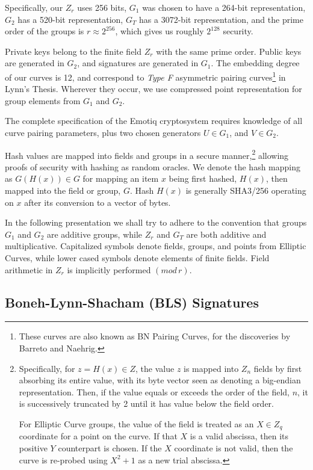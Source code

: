 \documentclass{yellowpaper}
\begin{document}
Specifically, our $Z_r$ uses 256 bits, $G_1$ was chosen to have a 264-bit representation, $G_2$ has a 520-bit representation, $G_T$ has a 3072-bit representation, and the prime order of the groups is $r \approx  2^{256}$, which gives us roughly $2^{128}$ security.

Private keys belong to the finite field $Z_r$ with the same prime order. Public keys are generated in $G_2$, and signatures are generated in $G_1$. The embedding degree of our curves is 12, and correspond to {\emph{Type F}} asymmetric pairing curves\footnote{These curves are also known as BN Pairing Curves, for the discoveries by Barreto and Naehrig.\cite{bn}} in Lynn's Thesis\cite{thesis}. Wherever they occur, we use  compressed point representation for group elements from $G_1$ and $G_2$.

The complete specification of the Emotiq cryptosystem requires knowledge of all curve pairing parameters, plus two chosen generators $U \in G_1$, and $V \in G_2$. 

Hash values are mapped into fields and groups in a secure manner,\footnote{Specifically, for $z = H(x) \in Z$, the value $z$ is mapped into $Z_n$ fields by first absorbing its entire value, with its byte vector seen as denoting a big-endian representation. Then, if the value equals or exceeds the order of the field, $n$, it is successively truncated by 2 until it has value below the field order. 

For Elliptic Curve groups, the value of the field is treated as an $X \in Z_q$ coordinate for a point on the curve. If that $X$ is a valid abscissa, then its positive $Y$ counterpart is chosen. If the $X$ coordinate is not valid, then the curve is re-probed using $X^2+1$ as a new trial abscissa.} allowing proofs of security with hashing as random oracles. We denote the hash mapping as $G(H(x)) \in G$ for mapping an item $x$ being first hashed, $H(x)$, then mapped into the field or group, $G$. Hash $H(x)$ is generally SHA3/256 operating on $x$  after its conversion to a vector of bytes.

In the following presentation we shall try to adhere to the convention that groups $G_1$ and $G_2$ are additive groups, while $Z_r$ and $G_T$ are both additive and multiplicative. Capitalized symbols denote fields, groups, and points from Elliptic Curves, while lower cased symbols denote elements of finite fields. Field arithmetic in $Z_r$ is implicitly performed $(mod\,r)$.

\subsection{Boneh-Lynn-Shacham (BLS) Signatures}
\end{document}
